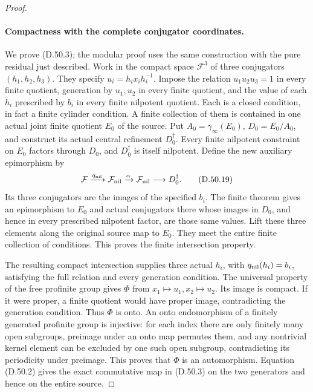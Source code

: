 \begin{proof}
\paragraph{Compactness with the complete conjugator coordinates.}
We prove \textup{(D.50.3)}; the modular proof uses the
same construction with the pure residual just described.
Work in the compact space \(\mathcal F^3\) of three
conjugators \((h_1,h_2,h_3)\). They specify
\(u_i=h_ix_ih_i^{-1}\).
Impose the relation \(u_1u_2u_3=1\) in every finite
quotient, generation by \(u_1,u_2\) in every finite
quotient, and the value of each \(h_i\) prescribed by
\(b_i\) in every finite nilpotent quotient.
Each is a closed condition, in fact a finite cylinder
condition. A finite collection of them is contained in
one actual joint finite quotient \(E_0\) of the source.
Put \(A_0=\gamma_\infty(E_0)\), \(D_0=E_0/A_0\), and
construct its actual central refinement \(D_0^\dagger\).
Every finite nilpotent constraint on \(E_0\) factors
through \(D_0\), and \(D_0^\dagger\) is itself
nilpotent. Define the new auxiliary epimorphism by
\[
 \mathcal F\xrightarrow{q_{\rm nil}}\mathcal F_{\rm nil}
       \xrightarrow{\alpha}\mathcal F_{\rm nil}
       \longrightarrow D_0^\dagger.
 \tag{D.50.19}
\]
Its three conjugators are the images of the specified
\(b_i\). The finite theorem gives an epimorphism to
\(E_0\) and actual conjugators there whose images in
\(D_0\), and hence in every prescribed nilpotent
factor, are those same values. Lift these three
elements along the original source map to \(E_0\).
They meet the entire finite collection of conditions.
This proves the finite intersection property.

The resulting compact intersection supplies three
actual \(h_i\), with \(q_{\rm nil}(h_i)=b_i\), satisfying
the full relation and every generation condition.
The universal property of the free profinite group gives
\(\Phi\) from \(x_1\mapsto u_1,x_2\mapsto u_2\).
Its image is compact. If it were proper, a finite
quotient would have proper image, contradicting the
generation condition. Thus \(\Phi\) is onto.
An onto endomorphism of a finitely generated profinite
group is injective: for each index there are only
finitely many open subgroups, preimage under an onto
map permutes them, and any nontrivial kernel element
can be excluded by one such open subgroup, contradicting
its periodicity under preimage. This proves that
\(\Phi\) is an automorphism.
Equation \textup{(D.50.2)} gives the exact commutative
map in \textup{(D.50.3)} on the two generators and
hence on the entire source.


\end{proof}
